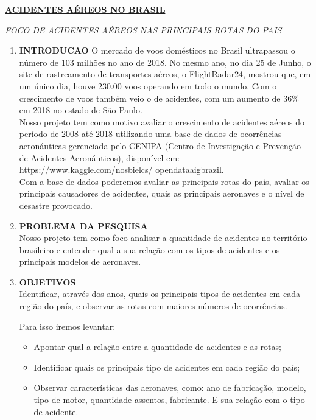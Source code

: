 \documentclass[14pt, a4paper]{article}
\begin{document}
	\begin{center}
		\underline{\textbf{ACIDENTES AÉREOS NO BRASIL}}\linebreak
		
		\textit{FOCO DE ACIDENTES AÉREOS NAS PRINCIPAIS ROTAS DO PAIS}\linebreak 	
	\end{center}
	
	\begin{enumerate}
		\item \textbf{INTRODUCAO}
		\newline
		O mercado de voos domésticos no Brasil ultrapassou o número de 103 milhões 		no ano de 2018. No mesmo ano, no dia 25 de Junho, o site de rastreamento de 	transportes aéreos, o FlightRadar24, mostrou que, em um único dia, houve 		230.00 voos operando em todo o mundo. Com o crescimento de voos também veio 	o de acidentes, com um aumento de 36\% em 2018 no estado de São Paulo. \\
		Nosso projeto tem como motivo avaliar o crescimento de acidentes aéreos 	do período de 2008 até 2018 utilizando uma base de dados de ocorrências 		aeronáuticas gerenciada pelo CENIPA (Centro de Investigação e Prevenção de 		Acidentes Aeronáuticos), disponível em:  https://www.kaggle.com/nosbielcs/		opendataaigbrazil.\\
		Com a base de dados poderemos avaliar as principais rotas do país, 			avaliar os principais causadores de acidentes, quais as principais 				aeronaves e o nível de desastre provocado. 
		
		
		
		
		\item \textbf{PROBLEMA DA PESQUISA}\\
		\newline
		Nosso projeto tem como foco analisar a quantidade de acidentes no território brasileiro e entender qual a sua relação com os tipos de acidentes e os principais modelos de aeronaves. 
		
		
		
		
		
		\item \textbf{OBJETIVOS}\newline
		\\
		Identificar, através dos anos, quais os principais tipos de acidentes em cada região do país, e observar as rotas com maiores números de ocorrências.
		
		\underline{Para isso iremos levantar:} 
		\begin{itemize}
			\item Apontar qual a relação entre a quantidade de acidentes e as rotas;
			\item Identificar quais os principais tipo de acidentes em cada região do país;
			\item Observar características das aeronaves, como: ano de fabricação, modelo, tipo de motor, quantidade assentos, fabricante. E sua relação com o tipo de acidente.   
		\end{itemize}		
		

\end{enumerate}
\end{document}
